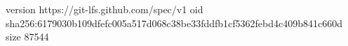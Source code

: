 version https://git-lfs.github.com/spec/v1
oid sha256:6179030b109dfefc005a517d068c38be33fddfb1cf5362febd4c409b841c660d
size 87544

